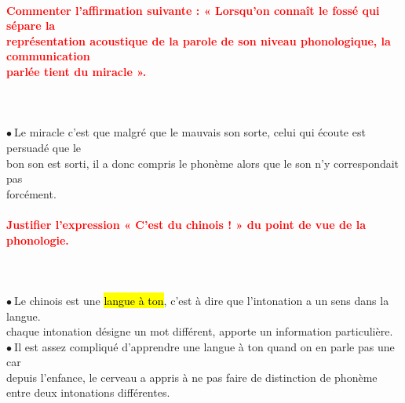 \documentclass[letterpaper, 12pt]{article}
\newcommand{\alinea}{
\hspace*{0.3cm}}
\newcommand{\red}[1]{
	\textcolor{red}{#1}
}
\newcommand{\point}{$\bullet\ $}
\begin{document}
		\paragraph{\red{Commenter l'affirmation suivante : « Lorsqu'on connaît le fossé qui sépare la  
		~\\ \hspace*{0.035cm} représentation acoustique de la parole de son niveau phonologique, la communication 
		~\\ \hspace*{0.035cm} parlée tient du miracle ».}}~\\~\\
			\point Le miracle c'est que malgré que le mauvais son sorte, celui qui écoute est persuadé que le
				\\\alinea bon son est sorti, il a donc compris le phon\`eme alors que le son n'y correspondait pas 
				\\\alinea forcément.
		
		\paragraph{\red{Justifier l'expression « C'est du chinois ! » du point de vue de la phonologie.}}~\\~\\
			\point Le chinois est une \hl{langue \`a ton}, c'est à dire que l'intonation a un sens dans la langue.
				\\\alinea chaque intonation désigne un mot différent, apporte un information particulière.\\
			\point Il est assez compliqué d'apprendre une langue à ton quand on en parle pas une car 
				\\\alinea depuis l'enfance, le cerveau a appris à ne pas faire de distinction de phon\`eme 
				\\\alinea entre deux intonations différentes.
				
		\pagebreak
		
\end{document}
